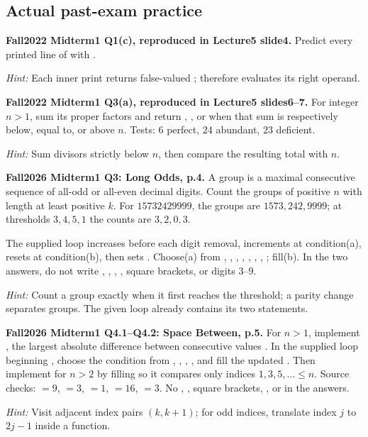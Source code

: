 \subsection{Actual past-exam practice}
\begin{prob}
\textbf{Fall2022 Midterm1 Q1(c), reproduced in Lecture5 slide4.} Predict every printed line of  with .\par
\emph{Hint:} Each inner print returns false-valued ;  therefore evaluates its right operand.
\end{prob}
\begin{prob}
\textbf{Fall2022 Midterm1 Q3(a), reproduced in Lecture5 slides6--7.} For integer $ n>1$, sum its proper factors and return , , or  when that sum is respectively below, equal to, or above $ n $. Tests: $6$ perfect, $24$ abundant, $23$ deficient.\par
\emph{Hint:} Sum divisors strictly below $ n $, then compare the resulting total with $ n $.
\end{prob}
\begin{prob}
\textbf{Fall2026 Midterm1 Q3: Long Odds, p.4.} A group is a maximal consecutive sequence of all-odd or all-even decimal digits. Count the groups of positive $ n $ with length at least positive $ k $. For $15732429999$, the groups are $1573,242,9999$; at thresholds $3,4,5,1$ the counts are $3,2,0,3$.

The supplied loop increases  before each digit removal, increments  at condition(a), resets  at condition(b), then sets . Choose(a) from , , , , , , , ; fill(b). In the two answers, do not write , , , , square brackets, or digits $3$--$9$.\par
\emph{Hint:} Count a group exactly when it first reaches the threshold; a parity change separates groups. The given loop already contains its two  statements.
\end{prob}
\begin{prob}
\textbf{Fall2026 Midterm1 Q4.1--Q4.2: Space Between, p.5.} For $ n>1$, implement , the largest absolute difference between consecutive values . In the supplied loop beginning , choose the condition from , , , , and fill the updated . Then implement  for $ n>2$ by filling  so it compares only indices $1,3,5,\ldots\le n $. Source checks: $=9$, $=3$, $=1$, $=16$, $=3$. No , , square brackets, , or  in the answers.\par
\emph{Hint:} Visit adjacent index pairs $(k,k+1)$; for odd indices, translate index $ j $ to $2j-1$ inside a function.
\end{prob}
